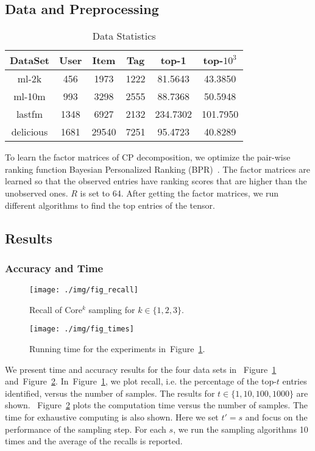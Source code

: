 \documentclass[letterpaper]{article}
\newcommand{\Fig}[1]{Figure~\ref{fig:#1}}
\begin{document}
\subsection{Data and Preprocessing}
\begin{table}[!]
  \centering
  \begin{tabular}{|c|c|c|c|c|c|}
    \hline
    DataSet     & User & Item    & Tag    & top-1   & top-$10^3$\\
    \hline
    ml-2k       & 456  &  1973   &  1222  & 81.5643  & 43.3850 \\
    ml-10m      & 993  &  3298   &  2555  & 88.7368 & 50.5948 \\
    lastfm      & 1348 &  6927   &  2132  & 234.7302 & 101.7950\\
    delicious   & 1681 &  29540  &  7251  & 95.4723  & 40.8289 \\
    \hline
  \end{tabular}
  \caption{Data Statistics}
  \label{table:Data}
\end{table}
To learn the factor matrices of CP decomposition, 
we optimize the pair-wise 
ranking function Bayesian Personalized Ranking (BPR)~\cite{Rendle_BPR,Rendle_RTF}.
The factor matrices are learned so that the observed entries have ranking scores that are higher than the unobserved ones. $R$ is set to 64. After getting the factor matrices, we run different algorithms to find the top entries of the tensor.

\subsection{Results}
\subsubsection{Accuracy and Time}

\begin{figure}[!]
  \centering
  \texttt{[image: ./img/fig\_recall]}\\
  \caption{Recall of Core$^k$ sampling for $k\in\{1,2,3\}$.}
  \label{fig:recall}
\end{figure}
\begin{figure}[!]
    \centering
    \texttt{[image: ./img/fig\_times]}\\
    \caption{Running time for the experiments in~\Fig{recall}.}
    \label{fig:time}
\end{figure}
We present time and accuracy results for the four data sets in 
~\Fig{recall} and~\Fig{time}. 
In~\Fig{recall}, we plot recall, i.e. the percentage of the top-$t$ entries identified, 
versus the number of samples. 
The results for $t\in\{1,10,100,1000\}$ are shown. 
~\Fig{time} plots the computation time versus the number of samples. 
The time for exhaustive computing is also shown. 
Here we set $t'=s$ and focus on the performance of the sampling step. 
For each $s$, we run the sampling algorithms 10 times and the average of the recalls is reported.
\end{document}
